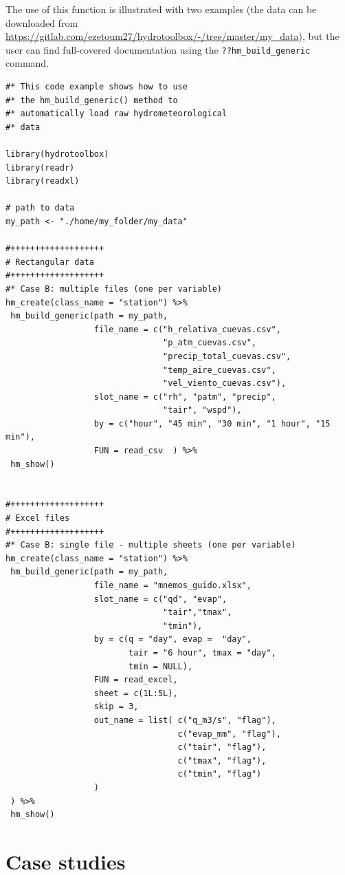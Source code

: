 \noindent
The use of this function is illustrated with two examples (the data can be
downloaded from
\url{https://gitlab.com/ezetoum27/hydrotoolbox/-/tree/master/my_data}), but
the user can find full-covered documentation using the
\texttt{??hm\_build\_generic} command.

\begin{verbatim}
#* This code example shows how to use 
#* the hm_build_generic() method to 
#* automatically load raw hydrometeorological 
#* data

library(hydrotoolbox)
library(readr)
library(readxl)

# path to data
my_path <- "./home/my_folder/my_data"

#+++++++++++++++++++
# Rectangular data
#+++++++++++++++++++
#* Case B: multiple files (one per variable)
hm_create(class_name = "station") %>%
 hm_build_generic(path = my_path,
                  file_name = c("h_relativa_cuevas.csv",
                                "p_atm_cuevas.csv",
                                "precip_total_cuevas.csv",
                                "temp_aire_cuevas.csv",
                                "vel_viento_cuevas.csv"),
                  slot_name = c("rh", "patm", "precip",
                                "tair", "wspd"),
                  by = c("hour", "45 min", "30 min", "1 hour", "15 min"),
                  FUN = read_csv  ) %>%
 hm_show()


#+++++++++++++++++++
# Excel files
#+++++++++++++++++++
#* Case B: single file - multiple sheets (one per variable)
hm_create(class_name = "station") %>%
 hm_build_generic(path = my_path,
                  file_name = "mnemos_guido.xlsx",
                  slot_name = c("qd", "evap",
                                "tair","tmax",
                                "tmin"),
                  by = c(q = "day", evap =  "day",
                         tair = "6 hour", tmax = "day",
                         tmin = NULL),
                  FUN = read_excel,
                  sheet = c(1L:5L),
                  skip = 3,
                  out_name = list( c("q_m3/s", "flag"),
                                   c("evap_mm", "flag"),
                                   c("tair", "flag"),
                                   c("tmax", "flag"),
                                   c("tmin", "flag")
                  )
 ) %>%
 hm_show()
\end{verbatim}

\hypertarget{case-studies}{%
\section{Case studies}\label{case-studies}}

